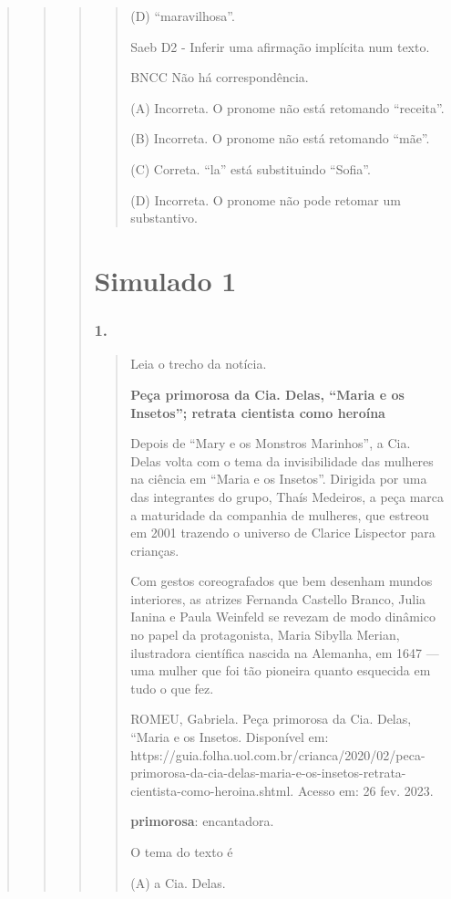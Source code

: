 \begin{quote}
\begin{quote}
\begin{quote}
\begin{quote}
(D) ``maravilhosa''.

Saeb D2 - Inferir uma afirmação implícita num texto.

BNCC Não há correspondência.

(A) Incorreta. O pronome não está retomando ``receita''.

(B) Incorreta. O pronome não está retomando ``mãe''.

(C) Correta. ``la'' está substituindo ``Sofia''.

(D) Incorreta. O pronome não pode retomar um substantivo.
\end{quote}

\section{Simulado 1}\label{simulado-1}

\subsubsection{1. }\label{section-80}

\begin{quote}
Leia o trecho da notícia.

\textbf{Peça primorosa da Cia. Delas, ``Maria e os Insetos''; retrata
cientista como heroína}

Depois de ``Mary e os Monstros Marinhos'', a Cia. Delas volta com o tema
da invisibilidade das mulheres na ciência em ``Maria e os Insetos''.
Dirigida por uma das integrantes do grupo, Thaís Medeiros, a peça marca
a maturidade da companhia de mulheres, que estreou em 2001 trazendo o
universo de Clarice Lispector para crianças.

Com gestos coreografados que bem desenham mundos interiores​, as atrizes
Fernanda Castello Branco, Julia Ianina e Paula Weinfeld se revezam de
modo dinâmico no papel da protagonista, Maria Sibylla Merian,
ilustradora científica nascida na Alemanha, em 1647 --- uma mulher que
foi tão pioneira quanto esquecida em tudo o que fez.

ROMEU, Gabriela. Peça primorosa da Cia. Delas, ``Maria e os Insetos.
Disponível em:
https://guia.folha.uol.com.br/crianca/2020/02/peca-primorosa-da-cia-delas-maria-e-os-insetos-retrata-cientista-como-heroina.shtml.
Acesso em: 26 fev. 2023.

\textbf{primorosa}: encantadora.

O tema do texto é

(A) a Cia. Delas.


\end{quote}
\end{quote}
\end{quote}
\end{quote}
